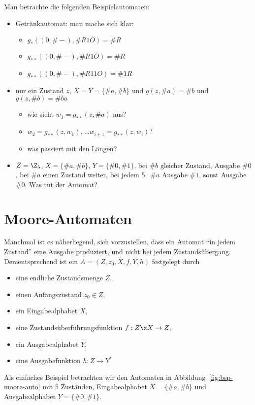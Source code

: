 \begin{extract}[tut]
  Man betrachte die folgenden Beispielautomaten:  
  \begin{itemize}
  \item Getränkautomat: man mache sich klar:
    \begin{itemize}
    \item $g_*((0,\#-), \#{R1O})= \#R$
    \item $g_{**}((0,\#-), \#{R1O})= \#R$
    \item $g_{**}((0,\#-), \#{R11O})= \#{1R}$
    \end{itemize}
  \item nur ein Zustand $z$, $X=Y=\{\#a,\#b\}$  
    und $g(z,\#a)=\#{b}$ und $g(z,\#b)=\#{ba}$
    \begin{itemize}
    \item wie sieht $w_1=g_{**}(z,\#a)$ aus?
    \item $w_2=g_{**}(z,w_1)$, \dots $w_{i+1}=g_{**}(z,w_i)$?
    \item was passiert mit den Längen?
    \end{itemize}
  \item $Z=\Z_5$, $X=\{\#a,\#b\}$, $Y=\{\#0,\#1\}$, bei $\#b$ gleicher
    Zustand, Ausgabe $\#0$, bei $\#a$ einen Zustand weiter, bei jedem
    5.~$\#a$ Ausgabe $\#1$, sonst Ausgabe $\#0$. Was tut der Automat?
  \end{itemize}
\end{extract}

\Tut\section{Moore-Automaten}
\label{sec:moore}

Manchmal ist es näherliegend, sich vorzustellen, dass ein Automat "`in
jedem Zustand"' eine Ausgabe produziert, und nicht bei jedem
Zustandsübergang. Dementsprechend ist ein
$A=(Z,z_0,X,f,Y,h)$ festgelegt durch
\begin{itemize}
\item eine endliche Zustandsmenge $Z$,
\item einen Anfangszustand $z_0\in Z$,
\item ein Eingabealphabet $X$,
\item eine
  Zustandsüberführungsfunktion
  $f:Z\x X\to Z$,
\item ein Ausgabealphabet $Y$,
\item eine Ausgabefunktion $h:Z \to Y^*$
\end{itemize}
%
Als einfaches Beispiel betrachten wir den Automaten in
Abbildung~\ref{fig:bsp-moore-auto} mit $5$ Zuständen, Eingabealphabet
$X=\{\#a,\#b\}$ und Ausgabealphabet $Y=\{\#0,\#1\}$.

